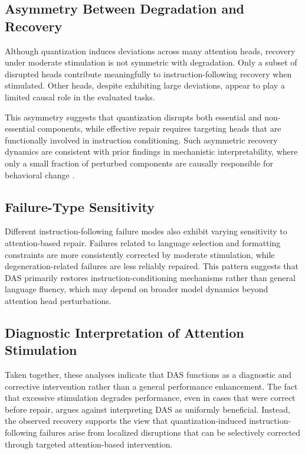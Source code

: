 \subsection{Asymmetry Between Degradation and Recovery}

Although quantization induces deviations across many attention heads,
recovery under moderate stimulation is not symmetric with degradation.
Only a subset of disrupted heads contribute meaningfully to instruction-following
recovery when stimulated.
Other heads, despite exhibiting large deviations, appear to play a limited causal
role in the evaluated tasks.

This asymmetry suggests that quantization disrupts both essential and
non-essential components, while effective repair requires targeting heads that
are functionally involved in instruction conditioning.
Such asymmetric recovery dynamics are consistent with prior findings in
mechanistic interpretability, where only a small fraction of perturbed components
are causally responsible for behavioral change
\citep{elhage2021mechanistic,nanda2023progress}.

\subsection{Failure-Type Sensitivity}

Different instruction-following failure modes also exhibit varying sensitivity to
attention-based repair.
Failures related to language selection and formatting constraints are more
consistently corrected by moderate stimulation, while degeneration-related
failures are less reliably repaired.
This pattern suggests that DAS primarily restores instruction-conditioning
mechanisms rather than general language fluency, which may depend on broader
model dynamics beyond attention head perturbations.

\subsection{Diagnostic Interpretation of Attention Stimulation}

Taken together, these analyses indicate that DAS functions as a diagnostic and
corrective intervention rather than a general performance enhancement.
The fact that excessive stimulation degrades performance, even in cases that were
correct before repair, argues against interpreting DAS as uniformly beneficial.
Instead, the observed recovery supports the view that quantization-induced
instruction-following failures arise from localized disruptions that can be
selectively corrected through targeted attention-based intervention.
